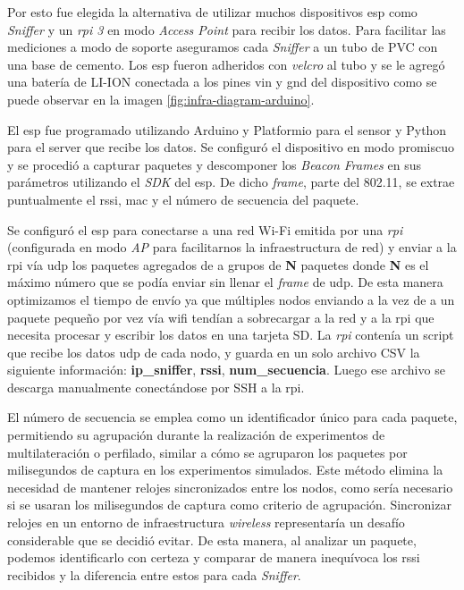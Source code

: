 Por esto fue elegida la alternativa de utilizar muchos dispositivos \acs{esp} como \textit{Sniffer} y un \textit{\acl{rpi} 3} en modo \textit{Access Point} para recibir los datos. Para facilitar las mediciones a modo de soporte aseguramos cada \textit{Sniffer} a un tubo de PVC con una base de cemento. Los \acs{esp} fueron adheridos con \textit{velcro} al tubo y se le agregó una batería de LI-ION conectada a los pines \acs{vin} y \acs{gnd} del dispositivo como se puede observar en la imagen \ref{fig:infra-diagram-arduino}.

El \acs{esp} fue programado utilizando Arduino y Platformio para el sensor y Python para el server que recibe los datos. Se configuró el dispositivo en modo promiscuo y se procedió a capturar paquetes y descomponer los \textit{Beacon Frames} en sus parámetros utilizando el \textit{SDK} del \acs{esp}. De dicho \textit{frame}, parte del 802.11, se extrae puntualmente el \acs{rssi}, \acs{mac} y el número de secuencia del paquete.

Se configuró el \acs{esp} para conectarse a una red Wi-Fi emitida por una \textit{\acl{rpi}} (configurada en modo \textit{AP} para facilitarnos la infraestructura de red) y enviar a la \acl{rpi} vía \acs{udp} los paquetes agregados de a grupos de \textbf{N} paquetes donde \textbf{N} es el máximo número que se podía enviar sin llenar el \textit{frame} de \acs{udp}. De esta manera optimizamos el tiempo de envío ya que múltiples nodos enviando a la vez de a un paquete pequeño por vez vía \acs{wifi} tendían a sobrecargar a la red y a la \acs{rpi} que necesita procesar y escribir los datos en una tarjeta SD.
La \textit{\acl{rpi}} contenía un script que recibe los datos \acs{udp} de cada nodo, y guarda en un solo archivo CSV la siguiente información: \textbf{ip\_sniffer}, \textbf{rssi}, \textbf{num\_secuencia}. Luego ese archivo se descarga manualmente conectándose por SSH a la \acs{rpi}.

El número de secuencia se emplea como un identificador único para cada paquete, permitiendo su agrupación durante la realización de experimentos de multilateración o perfilado, similar a cómo se agruparon los paquetes por milisegundos de captura en los experimentos simulados. Este método elimina la necesidad de mantener relojes sincronizados entre los nodos, como sería necesario si se usaran los milisegundos de captura como criterio de agrupación. Sincronizar relojes en un entorno de infraestructura \textit{wireless} representaría un desafío considerable que se decidió evitar.
De esta manera, al analizar un paquete, podemos identificarlo con certeza y comparar de manera inequívoca los \acs{rssi} recibidos y la diferencia entre estos para cada \textit{Sniffer}.


